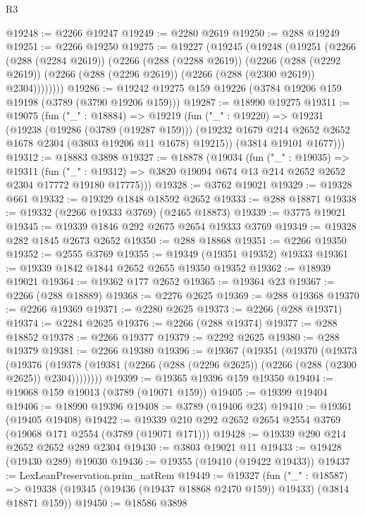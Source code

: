 \begin{lexlean}{R3}
\begin{coremodule}
@19248 := @2266 @19247
@19249 := @2280 @2619
@19250 := @288 @19249
@19251 := @2266 @19250
@19275 := @19227
    (@19245
      (@19248
        (@19251
          (@2266
            (@288 (@2284 @2619))
            (@2266
              (@288 (@2288 @2619))
              (@2266
                (@288 (@2292 @2619))
                (@2266 (@288 (@2296 @2619)) (@2266 (@288 (@2300 @2619)) @2304))))))))
@19286 := @19242 @19275 @159 @19226 (@3784 @19206 @159 @19198 (@3789 (@3790 @19206 @159)))
@19287 := @18990 @19275
@19311 := @19075
    (fun ("_" : @18884) =>
    @19219
      (fun ("_" : @19220) =>
      @19231
        (@19238
          (@19286 (@3789 (@19287 @159)))
          (@19232 @1679 @214 @2652 @2652 @1678 @2304 (@3803 @19206 @11 @1678) @19215))
        (@3814 @19101 @1677)))
@19312 := @18883 @3898
@19327 := @18878
    (@19034
      (fun ("_" : @19035) =>
      @19311
        (fun ("_" : @19312) => @3820 @19094 @674 @13 @214 @2652 @2652 @2304 @17772 @19180 @17775)))
@19328 := @3762 @19021
@19329 := @19328 @661
@19332 := @19329 @1848 @18592 @2652
@19333 := @288 @18871
@19338 := @19332 (@2266 @19333 @3769) (@2465 @18873)
@19339 := @3775 @19021
@19345 := @19339 @1846 @292 @2675 @2654 @19333 @3769
@19349 := @19328 @282 @1845 @2673 @2652
@19350 := @288 @18868
@19351 := @2266 @19350
@19352 := @2555 @3769
@19355 := @19349 (@19351 @19352) @19333
@19361 := @19339 @1842 @1844 @2652 @2655 @19350 @19352
@19362 := @18939 @19021
@19364 := @19362 @177 @2652
@19365 := @19364 @23
@19367 := @2266 (@288 @18889)
@19368 := @2276 @2625
@19369 := @288 @19368
@19370 := @2266 @19369
@19371 := @2280 @2625
@19373 := @2266 (@288 @19371)
@19374 := @2284 @2625
@19376 := @2266 (@288 @19374)
@19377 := @288 @18852
@19378 := @2266 @19377
@19379 := @2292 @2625
@19380 := @288 @19379
@19381 := @2266 @19380
@19396 := @19367
    (@19351
      (@19370
        (@19373
          (@19376
            (@19378 (@19381 (@2266 (@288 (@2296 @2625)) (@2266 (@288 (@2300 @2625)) @2304))))))))
@19399 := @19365 @19396 @159 @19350
@19404 := @19068 @159 @19013 (@3789 (@19071 @159))
@19405 := @19399 @19404
@19406 := @18990 @19396
@19408 := @3789 (@19406 @23)
@19410 := @19361 (@19405 @19408)
@19422 := @19339 @210 @292 @2652 @2654 @2554 @3769 (@19068 @171 @2554 (@3789 (@19071 @171)))
@19428 := @19339 @290 @214 @2652 @2652 @289 @2304
@19430 := @3803 @19021 @11
@19433 := @19428 (@19430 @289) @19030
@19436 := @19355 (@19410 (@19422 @19433))
@19437 := LexLeanPreservation.prim_natRem
@19449 := @19327
    (fun ("_" : @18587) =>
    @19338 (@19345 (@19436 (@19437 @18868 @2470 @159)) @19433) (@3814 @18871 @159))
@19450 := @18586 @3898

\end{coremodule}
\end{lexlean}
